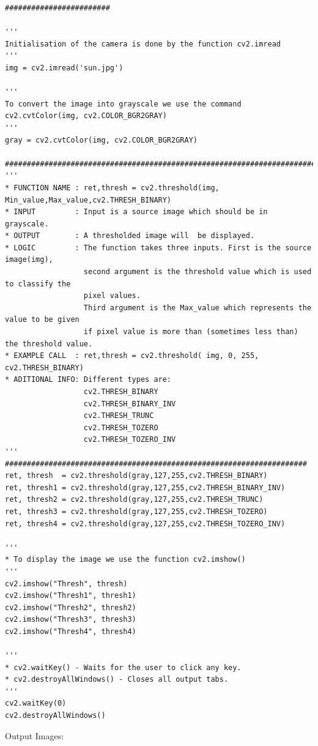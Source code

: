 \documentclass[]{article}
\begin{document}
\begin{verbatim}
########################

'''
Initialisation of the camera is done by the function cv2.imread
'''
img = cv2.imread('sun.jpg')

'''
To convert the image into grayscale we use the command
cv2.cvtColor(img, cv2.COLOR_BGR2GRAY)
'''
gray = cv2.cvtColor(img, cv2.COLOR_BGR2GRAY)

##########################################################################################
'''
* FUNCTION NAME : ret,thresh = cv2.threshold(img, Min_value,Max_value,cv2.THRESH_BINARY)
* INPUT         : Input is a source image which should be in grayscale.
* OUTPUT        : A thresholded image will  be displayed.
* LOGIC         : The function takes three inputs. First is the source image(img),
                  second argument is the threshold value which is used to classify the 
                  pixel values.
                  Third argument is the Max_value which represents the value to be given 
                  if pixel value is more than (sometimes less than) the threshold value.
* EXAMPLE CALL  : ret,thresh = cv2.threshold( img, 0, 255, cv2.THRESH_BINARY)
* ADITIONAL INFO: Different types are:
                  cv2.THRESH_BINARY
                  cv2.THRESH_BINARY_INV
                  cv2.THRESH_TRUNC
                  cv2.THRESH_TOZERO
                  cv2.THRESH_TOZERO_INV
'''
#####################################################################
ret, thresh  = cv2.threshold(gray,127,255,cv2.THRESH_BINARY)
ret, thresh1 = cv2.threshold(gray,127,255,cv2.THRESH_BINARY_INV)
ret, thresh2 = cv2.threshold(gray,127,255,cv2.THRESH_TRUNC)
ret, thresh3 = cv2.threshold(gray,127,255,cv2.THRESH_TOZERO)
ret, thresh4 = cv2.threshold(gray,127,255,cv2.THRESH_TOZERO_INV)

'''
* To display the image we use the function cv2.imshow()
'''
cv2.imshow("Thresh", thresh)
cv2.imshow("Thresh1", thresh1)
cv2.imshow("Thresh2", thresh2)
cv2.imshow("Thresh3", thresh3)
cv2.imshow("Thresh4", thresh4)

'''
* cv2.waitKey() - Waits for the user to click any key.
* cv2.destroyAllWindows() - Closes all output tabs.
'''
cv2.waitKey(0)
cv2.destroyAllWindows()
\end{verbatim}

Output Images:
\end{document}
